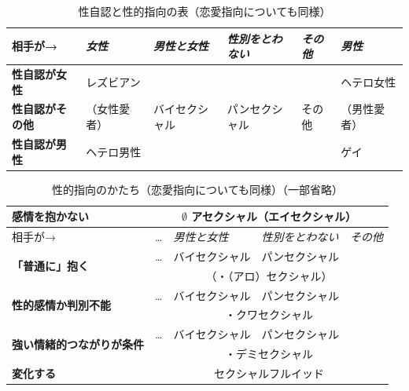 \documentclass[9pt,a3paper,oneside,twocolumn]{ltjsarticle}
\begin{document}
\begin{table}[h]
\centering
\begin{tabular}{l||l|l|l|l|l}
相手が→ & \emph{女性} & \emph{男性と女性} & \emph{性別をとわない} & \emph{その他} & \emph{男性} \\
\hline\hline
\textbf{性自認が女性} & レズビアン & \multirow{3}{*}{バイセクシャル} & \multirow{3}{*}{パンセクシャル} & \multirow{3}{*}{その他} & ヘテロ女性 \\
\cline{1-2}\cline{6-6}
\textbf{性自認がその他} & （女性愛者） & & & & （男性愛者） \\
\cline{1-2}\cline{6-6}
\textbf{性自認が男性} & ヘテロ男性 & & & & ゲイ \\
\hline
\end{tabular}
\caption{性自認と性的指向の表（恋愛指向についても同様）}
\label{table:genderidentity_orientation}
\end{table}

\begin{table}[h]
\centering
\begin{tabular}{l|llll}
\hline
\textbf{感情を抱かない} & \multicolumn{4}{c}{\(\emptyset\) アセクシャル（エイセクシャル）\footnotemark} \\
\hline\hline
相手が→ & … & \emph{男性と女性} & \emph{性別をとわない} & \emph{その他} \\
\hline\hline
\multirow{2}{*}{\textbf{「普通に」抱く}} & … & バイセクシャル & パンセクシャル & \\
& \multicolumn{4}{c}{（・（アロ）セクシャル）} \\
\hline
\multirow{2}{*}{\textbf{性的感情か判別不能}} & … & バイセクシャル & パンセクシャル & \\
& \multicolumn{4}{c}{・クワセクシャル} \\
\hline
\multirow{2}{*}{\textbf{強い情緒的つながりが条件}} & … & バイセクシャル & パンセクシャル & \\
& \multicolumn{4}{c}{・デミセクシャル} \\
\hline
\textbf{変化する} & \multicolumn{4}{c}{セクシャルフルイッド} \\
\hline
\end{tabular}
\caption{性的指向のかたち（恋愛指向についても同様）（一部省略）}
\label{table:sexual_orientation}
\end{table}

\end{document}
